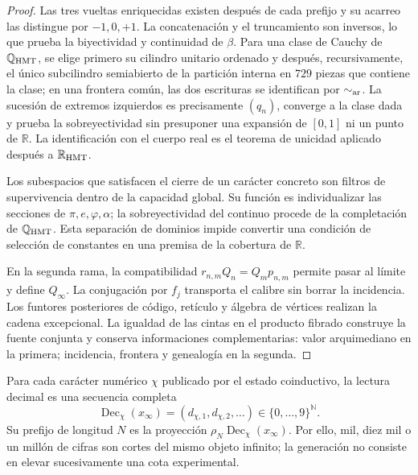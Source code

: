 \begin{proof}
Las tres vueltas enriquecidas existen después de cada prefijo y su acarreo
las distingue por \(-1,0,+1\). La concatenación y el truncamiento son
inversos, lo que prueba la biyectividad y continuidad de \(\beta\). Para una
clase de Cauchy de \(\mathbb Q_{\rm HMT}\), se elige primero su cilindro
unitario ordenado y después, recursivamente, el único subcilindro semiabierto
de la partición interna en \(729\) piezas que contiene la clase; en una
frontera común, las dos escrituras se identifican por \(\sim_{\rm ar}\).
La sucesión de extremos izquierdos es precisamente \((q_n)\), converge a la
clase dada y prueba la sobreyectividad sin presuponer una expansión de
\([0,1]\) ni un punto de \(\mathbb R\). La identificación con el cuerpo real
es el teorema de unicidad aplicado después a \(\mathbb R_{\rm HMT}\).

Los subespacios que satisfacen el cierre de un carácter concreto son filtros
de supervivencia dentro de la capacidad global. Su función es individualizar
las secciones de \(\pi,e,\varphi,\alpha\); la sobreyectividad del continuo
procede de la completación de \(\mathbb Q_{\rm HMT}\). Esta separación de
dominios impide
convertir una condición de selección de constantes en una premisa de la
cobertura de \(\mathbb R\).

En la segunda rama, la compatibilidad
\(r_{n,m}Q_n=Q_m p_{n,m}\) permite pasar al límite y define \(Q_\infty\).
La conjugación por \(f_j\) transporta el calibre sin borrar la incidencia.
Los funtores posteriores de código, retículo y álgebra de vértices realizan
la cadena excepcional. La igualdad de las cintas en el producto fibrado
construye la fuente conjunta y conserva informaciones complementarias: valor
arquimediano en la primera; incidencia, frontera y genealogía en la segunda.
\end{proof}

\begin{corollary}
\label{cor:c27-expansion-infinita-objeto}
Para cada carácter numérico \(\chi\) publicado por el estado coinductivo, la
lectura decimal es una secuencia completa
\[
 \operatorname{Dec}_\chi(x_\infty)
 =(d_{\chi,1},d_{\chi,2},\ldots)
 \in\{0,\ldots,9\}^{\mathbb N}.
\]
Su prefijo de longitud \(N\) es la proyección
\(\rho_N\operatorname{Dec}_\chi(x_\infty)\). Por ello, mil, diez mil o un
millón de cifras son cortes del mismo objeto infinito; la generación no
consiste en elevar sucesivamente una cota experimental.
\end{corollary}

